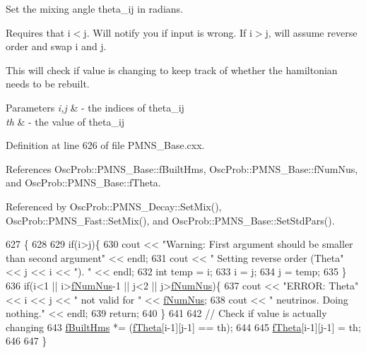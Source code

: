 Set the mixing angle theta\+\_\+ij in radians.

Requires that i$<$j. Will notify you if input is wrong. If i$>$j, will assume reverse order and swap i and j.

This will check if value is changing to keep track of whether the hamiltonian needs to be rebuilt.


\begin{DoxyParams}{Parameters}
{\em i,j} & -\/ the indices of theta\+\_\+ij \\
\hline
{\em th} & -\/ the value of theta\+\_\+ij \\
\hline
\end{DoxyParams}


Definition at line 626 of file P\+M\+N\+S\+\_\+\+Base.\+cxx.



References Osc\+Prob\+::\+P\+M\+N\+S\+\_\+\+Base\+::f\+Built\+Hms, Osc\+Prob\+::\+P\+M\+N\+S\+\_\+\+Base\+::f\+Num\+Nus, and Osc\+Prob\+::\+P\+M\+N\+S\+\_\+\+Base\+::f\+Theta.



Referenced by Osc\+Prob\+::\+P\+M\+N\+S\+\_\+\+Decay\+::\+Set\+Mix(), Osc\+Prob\+::\+P\+M\+N\+S\+\_\+\+Fast\+::\+Set\+Mix(), and Osc\+Prob\+::\+P\+M\+N\+S\+\_\+\+Base\+::\+Set\+Std\+Pars().


\begin{DoxyCode}
627 \{
628 
629   \textcolor{keywordflow}{if}(i>j)\{
630     cout << \textcolor{stringliteral}{"Warning: First argument should be smaller than second argument"} << endl;
631     cout << \textcolor{stringliteral}{"         Setting reverse order (Theta"} << j << i << \textcolor{stringliteral}{"). "} << endl;
632     \textcolor{keywordtype}{int} temp = i;
633     i = j;
634     j = temp;
635   \}
636   \textcolor{keywordflow}{if}(i<1 || i>\hyperlink{classOscProb_1_1PMNS__Base_a24bb74bed63569dfe88b18fa6a08060e}{fNumNus}-1 || j<2 || j>\hyperlink{classOscProb_1_1PMNS__Base_a24bb74bed63569dfe88b18fa6a08060e}{fNumNus})\{
637     cout << \textcolor{stringliteral}{"ERROR: Theta"} << i << j << \textcolor{stringliteral}{" not valid for "} << \hyperlink{classOscProb_1_1PMNS__Base_a24bb74bed63569dfe88b18fa6a08060e}{fNumNus};
638     cout << \textcolor{stringliteral}{" neutrinos. Doing nothing."} << endl;
639     \textcolor{keywordflow}{return};
640   \}
641 
642   \textcolor{comment}{// Check if value is actually changing}
643   \hyperlink{classOscProb_1_1PMNS__Base_a9ac3cadeac8db1b90f3152f476244780}{fBuiltHms} *= (\hyperlink{classOscProb_1_1PMNS__Base_a1976887cd658dd86b2336c181f1470b4}{fTheta}[i-1][j-1] == th);
644 
645   \hyperlink{classOscProb_1_1PMNS__Base_a1976887cd658dd86b2336c181f1470b4}{fTheta}[i-1][j-1] = th;
646 
647 \}
\end{DoxyCode}
\mbox{\label{classOscProb_1_1PMNS__Base_aba565962a440d14bee7a2a96d2eca2c5}} 
